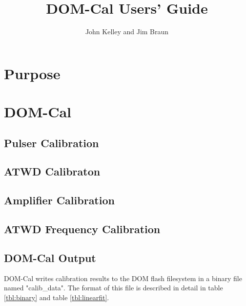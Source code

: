 \documentclass[10pt]{article}
\begin{document}
                                                                                
\baselineskip=16pt
\def\Z{{\bf Z}}
                                                                                
\newcommand{\infinity}{\infty}
                                                                                
\title{DOM-Cal Users' Guide}
\author{John Kelley and Jim Braun}
\maketitle
                                                                                
\newpage

\section{Purpose}

\section{DOM-Cal}

\subsection{Pulser Calibration}

\subsection{ATWD Calibraton}

\subsection{Amplifier Calibration}

\subsection{ATWD Frequency Calibration}

\subsection{DOM-Cal Output}

DOM-Cal writes calibration results to the DOM flash filesystem in a binary
file named "calib\_data".  The format of this file is described in detail in
table \ref{tbl:binary} and table \ref{tbl:linearfit}.
\end{document}
